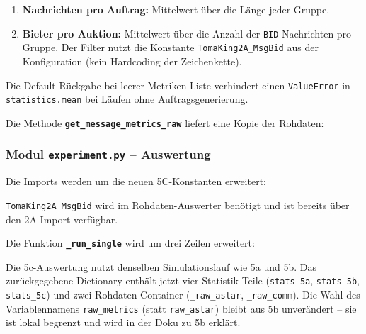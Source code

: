 \begin{enumerate}
    \item \textbf{Nachrichten pro Auftrag:} Mittelwert über die Länge jeder Gruppe.
    \item \textbf{Bieter pro Auktion:} Mittelwert über die Anzahl der \texttt{BID}-Nachrichten pro Gruppe. Der Filter nutzt die Konstante \texttt{TomaKing2A\_MsgBid} aus der Konfiguration (kein Hardcoding der Zeichenkette).
\end{enumerate}

Die Default-Rückgabe bei leerer Metriken-Liste verhindert einen \texttt{ValueError} in \texttt{statistics.mean} bei Läufen ohne Auftragsgenerierung.

Die Methode \textbf{\texttt{get\_message\_metrics\_raw}} liefert eine Kopie der Rohdaten:




\subsubsection{Modul \texttt{experiment.py} – Auswertung}

Die Imports werden um die neuen 5C-Konstanten erweitert:



\texttt{TomaKing2A\_MsgBid} wird im Rohdaten-Auswerter benötigt und ist bereits über den 2A-Import verfügbar.


Die Funktion \textbf{\texttt{\_run\_single}} wird um drei Zeilen erweitert:



Die 5c-Auswertung nutzt denselben Simulationslauf wie 5a und 5b. Das zurückgegebene Dictionary enthält jetzt vier Statistik-Teile (\texttt{stats\_5a}, \texttt{stats\_5b}, \texttt{stats\_5c}) und zwei Rohdaten-Container (\texttt{\_raw\_astar}, \texttt{\_raw\_comm}). Die Wahl des Variablennamens \texttt{raw\_metrics} (statt \texttt{raw\_astar}) bleibt aus 5b unverändert -- sie ist lokal begrenzt und wird in der Doku zu 5b erklärt.

